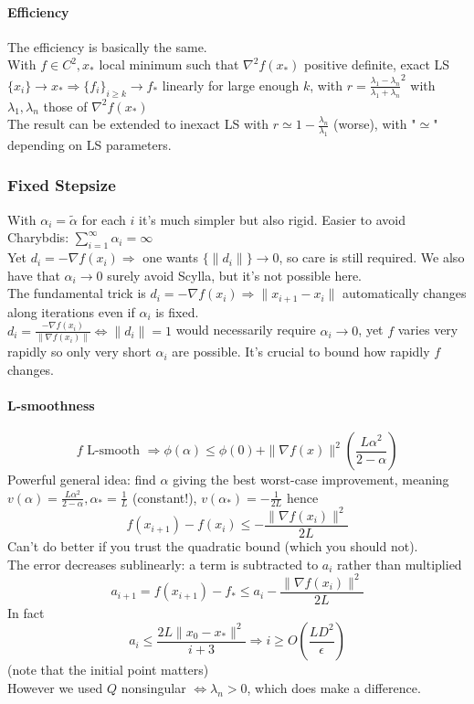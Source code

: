 \documentclass[10pt]{report}
\begin{document}
\paragraph{Efficiency} The efficiency is basically the same.\\
With $f\in C^2, x_*$ local minimum such that $\nabla^2f(x_*)$ positive definite, exact LS $\{x_i\}\rightarrow x_* \Rightarrow \{f_i\}_{i\geq k}\rightarrow f_*$ linearly for large enough $k$, with $r = \frac{\lambda_1 - \lambda_n}{\lambda_1 + \lambda_n}^2$ with $\lambda_1,\lambda_n$ those of $\nabla^2 f(x_*)$\\
The result can be extended to inexact LS with $r\simeq 1-\frac{\lambda_n}{\lambda_1}$ (worse), with "$\simeq$" depending on LS parameters.
\subsubsection{Fixed Stepsize}
With $\alpha_i = \tilde{\alpha}$ for each $i$ it's much simpler but also rigid. Easier to avoid Charybdis: $\sum_{i=1}^\infty \alpha_i = \infty$\\
Yet $d_i = -\nabla f(x_i) \Rightarrow$ one wants $\{\|d_i\|\}\rightarrow 0$, so care is still required. We also have that $\alpha_i\rightarrow 0$ surely avoid Scylla, but it's not possible here.\\
The fundamental trick is $d_i = -\nabla f(x_i) \Rightarrow \|x_{i+1} - x_i\|$ automatically changes along iterations even if $\alpha_i$ is fixed.\\
$d_i = \frac{-\nabla f(x_i)}{\|\nabla f(x_i)\|} \Leftrightarrow \|d_i\| = 1$ would necessarily require $\alpha_i \rightarrow 0$, yet $f$ varies very rapidly so only very short $\alpha_i$ are possible. It's crucial to bound how rapidly $f$ changes.
\paragraph{L-smoothness} $$f \text{ L-smooth }\Rightarrow \phi(\alpha) \leq \phi(0) + \|\nabla f(x)\|^2\left(\frac{L\alpha^2}{2-\alpha}\right)$$
Powerful general idea: find $\alpha$ giving the best worst-case improvement, meaning $v(\alpha) = \frac{L\alpha^2}{2-\alpha}, \alpha_* = \frac{1}{L}$ (constant!), $v(\alpha_*) = -\frac{1}{2L}$ hence $$f(x_{i+1}) - f(x_i) \leq -\frac{\|\nabla f(x_i)\|^2}{2L}$$ Can't do better if you trust the quadratic bound (which you should not).\\
The error decreases sublinearly: a term is subtracted to $a_i$ rather than multiplied $$a_{i+1} = f(x_{i+1}) - f_* \leq a_i - \frac{\|\nabla f(x_i)\|^2}{2L}$$
In fact $$a_i\leq \frac{2L\|x_0 - x_*\|^2}{i+3} \Rightarrow i\geq O\left(\frac{LD^2}{\epsilon}\right)$$ (note that the initial point matters)\\
However we used $Q$ nonsingular $\Leftrightarrow \lambda_n > 0$, which does make a difference.
\end{document}
